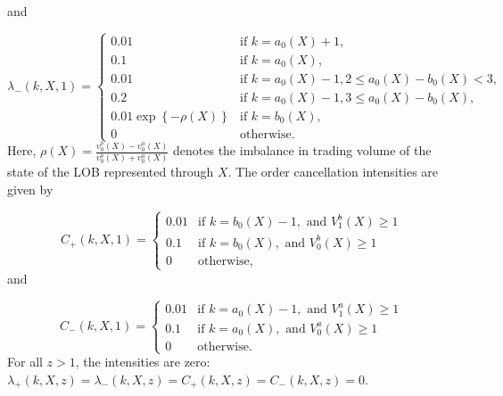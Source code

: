 \documentclass[10pt,a4paper,oneside]{article}
\providecommand{\DIFaddbegin}{} %
\providecommand{\DIFaddend}{} %
\providecommand{\DIFdelbegin}{} %
\providecommand{\DIFdelend}{} %
\newcommand{\DIFscaledelfig}{0.5}
\newlength{\DIFdelgraphicswidth} %
\newlength{\DIFdelgraphicsheight} %
\newcommand{\DIFaddincludegraphics}[2][]{{\color{blue}\fbox{\DIFOincludegraphics[#1]{#2}}}} %
\newcommand{\DIFdelincludegraphics}[2][]{%
\sbox{\DIFdelgraphicsbox}{\DIFOincludegraphics[#1]{#2}}%
\settoboxwidth{\DIFdelgraphicswidth}{\DIFdelgraphicsbox} %
\settoboxtotalheight{\DIFdelgraphicsheight}{\DIFdelgraphicsbox} %
\scalebox{\DIFscaledelfig}{%
\parbox[b]{\DIFdelgraphicswidth}{\usebox{\DIFdelgraphicsbox}\\[-\baselineskip] \rule{\DIFdelgraphicswidth}{0em}}\llap{\resizebox{\DIFdelgraphicswidth}{\DIFdelgraphicsheight}{%
\setlength{\unitlength}{\DIFdelgraphicswidth}%
\begin{picture}(1,1)%
\thicklines\linethickness{2pt} %
{\color[rgb]{1,0,0}\put(0,0){\framebox(1,1){}}}%
{\color[rgb]{1,0,0}\put(0,0){\line( 1,1){1}}}%
{\color[rgb]{1,0,0}\put(0,1){\line(1,-1){1}}}%
\end{picture}%
}\hspace*{3pt}}} %
} %
\DeclareRobustCommand{\DIFaddbegin}{\DIFOaddbegin \let\includegraphics\DIFaddincludegraphics} %
\DeclareRobustCommand{\DIFaddend}{\DIFOaddend \let\includegraphics\DIFOincludegraphics} %
\DeclareRobustCommand{\DIFdelbegin}{\DIFOdelbegin \let\includegraphics\DIFdelincludegraphics} %
\DeclareRobustCommand{\DIFdelend}{\DIFOaddend \let\includegraphics\DIFOincludegraphics} %
\begin{document}
and

\[
    \lambda_-(k, X, 1) =
    \begin{cases}
        0.01                                 & \text{if } k = a_0(X) + 1,                             \\
        0.1                                  & \text{if } k = a_0(X),                                 \\
        0.01                                 & \text{if } k = a_0(X) - 1, 2 \leq a_0(X) - b_0(X) < 3, \\
        0.2                                  & \text{if } k = a_0(X) - 1, 3 \leq a_0(X) - b_0(X),     \\
        0.01 \exp \left\{ - \rho(X) \right\} & \text{if } k = b_0(X),                                 \\
        0                                    & \text{otherwise.}
    \end{cases}
\]
Here, $\rho(X) = \frac{v^b_0(X) - v^a_0(X)}{v^b_0(X) + v^a_0(X)}$ denotes the imbalance in trading volume of the state of the LOB represented through $X$. The order cancellation intensities are given by

\[
    C_+(k, X, 1) =
    \DIFdelbegin %
\DIFdelend \DIFaddbegin \begin{cases}
        0.01 & \text{if } k = b_0(X) - 1, \text{ and } V^b_1(X) \geq 1 \\
        0.1  & \text{if } k = b_0(X), \text{ and } V^b_0(X) \geq 1     \\
        0    & \text{otherwise,}
    \end{cases}\DIFaddend 
\]
and

\[
    C_-(k, X, 1) =
    \DIFdelbegin %
\DIFdelend \DIFaddbegin \begin{cases}
        0.01 & \text{if } k = a_0(X) - 1, \text{ and } V^a_1(X) \geq 1 \\
        0.1  & \text{if } k = a_0(X), \text{ and }  V^a_0(X) \geq 1    \\
        0    & \text{otherwise.}
    \end{cases}\DIFaddend 
\]
For all $z > 1$, the intensities are zero: $\lambda_+(k, X, z) = \lambda_-(k, X, z) = C_+(k, X, z) = C_-(k, X, z) = 0$.
\end{document}
